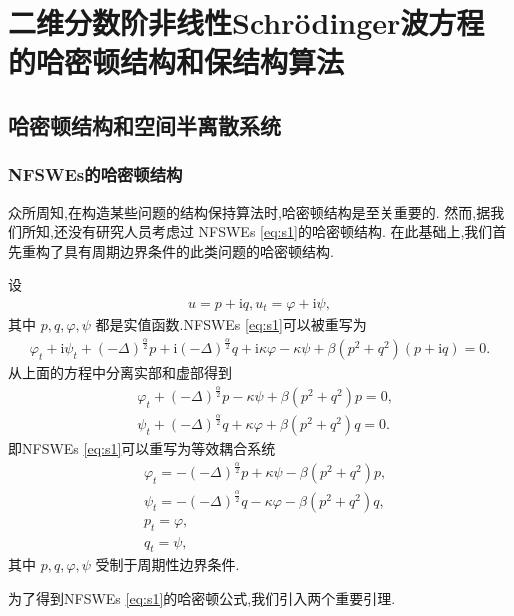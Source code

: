 \chapter[二维分数阶非线性Schr{\"o}dinger波方程的哈密顿结构和保结构算法]{二维分数阶非线性Schr{\"o}dinger波方程的哈密顿结构和保结构算法}
\section{哈密顿结构和空间半离散系统}\label{Section 2}
\subsection{NFSWEs的哈密顿结构}
众所周知,在构造某些问题的结构保持算法时,哈密顿结构是至关重要的.
然而,据我们所知,还没有研究人员考虑过 NFSWEs \eqref{eq:s1}的哈密顿结构.
在此基础上,我们首先重构了具有周期边界条件的此类问题的哈密顿结构.

设
\begin{align}
u = p+\mathrm{i}q, u_t = \varphi+ \mathrm{i}\psi,
\end{align}
其中 $p, q,\varphi,\psi$ 都是实值函数.NFSWEs \eqref{eq:s1}可以被重写为
\begin{align}\label{eq_28}
\varphi_{t}+\mathrm{i}\psi_{t}+\left( -\Delta \right) ^{\frac{\alpha }{2}}p+\mathrm{i}\left( -\Delta \right) ^{\frac{\alpha }{2}}q+\mathrm{i}\kappa \varphi-\kappa \psi+\beta \left( p^{2}+q^{2}\right) \left( p+\mathrm{i} q\right) =0.
\end{align}
从上面的方程中分离实部和虚部得到
\begin{align}
&\varphi_{t}+\left( -\Delta \right) ^{\frac{\alpha }{2}}p-\kappa \psi+\beta \left( p^{2}+q^{2}\right)p=0,\nonumber\\
&\psi_{t}+\left( -\Delta \right) ^{\frac{\alpha }{2}}q+\kappa \varphi+\beta \left( p^{2}+q^{2}\right)q=0.\label{eq_29}
\end{align}
即NFSWEs \eqref{eq:s1}可以重写为等效耦合系统
\begin{align}
&\varphi_{t}=-\left( -\Delta \right) ^{\frac{\alpha }{2}}p+\kappa \psi-\beta \left( p^{2}+q^{2}\right)p\label{eq_30},\\
&\psi_{t}=-\left( -\Delta \right) ^{\frac{\alpha }{2}}q-\kappa \varphi-\beta \left( p^{2}+q^{2}\right)q\label{eq_31},\\
&p_t=\varphi, \label{eq_32}\\
&q_t=\psi, \label{eq_33}
\end{align}
其中 $p, q,\varphi,\psi$ 受制于周期性边界条件.

为了得到NFSWEs \eqref{eq:s1}的哈密顿公式,我们引入两个重要引理.

